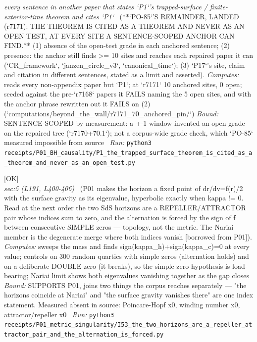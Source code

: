 \begin{description}
\textit{every sentence in another paper that states `P1`'s trapped-surface / finite-exterior-time theorem and cites `P1`} \ (**`PO-85`'S REMAINDER, LANDED (r7171): THE THEOREM IS CITED AS A THEOREM AND NEVER AS AN OPEN TEST, AT EVERY SITE A SENTENCE-SCOPED ANCHOR CAN FIND.** (1) absence of the open-test grade in each anchored sentence; (2) presence: the anchor still finds >= 10 sites and reaches each repaired paper it can (`CR\_framework`, `janzen\_circle\_v3`, `canonical\_time`); (3) `P17`'s site, claim and citation in different sentences, stated as a limit and asserted). 
\emph{Computes:} reads every non-appendix paper but `P1`; at `r7171` 10 anchored sites, 0 open; seeded against the pre-`r7168` papers it FAILS naming the 5 open sites, and with the anchor phrase rewritten out it FAILS on (2) (`computations/beyond\_the\_wall/r7171\_70\_anchored\_pin/`)
 \emph{Bound:} SENTENCE-SCOPED by measurement: a +-1 window invented an open grade on the repaired tree (`r7170+70.1`); not a corpus-wide grade check, which `PO-85` measured impossible from source
\ \emph{Run:} \texttt{python3 receipts/P01\_BH\_causality/P1\_the\_trapped\_surface\_theorem\_is\_cited\_as\_a\_theorem\_and\_never\_as\_an\_open\_test.py}
\item[\rcptlabel{I53_the_two_horizons_are_a_repeller_attractor_pair_and_the_alternation_is_forced}{P1R5}\textbf{P1R5}\quad\texttt{I53\_the\_two\_horizons\_are\_a\_repeller\_attractor\_pair\_and\_the\_alternation\_is\_forced}]\hfill\textsf{[OK]}\\
\textit{sec:5 (L191, L400-406)} \ (P01 makes the horizon a fixed point of dr/dv=f(r)/2 with the surface gravity as its eigenvalue, hyperbolic exactly when kappa != 0. Read at the next order the two SdS horizons are a REPELLER/ATTRACTOR pair whose indices sum to zero, and the alternation is forced by the sign of f between consecutive SIMPLE zeros --- topology, not the metric. The Nariai member is the degenerate merge where both indices vanish [borrowed from P01]). 
\emph{Computes:} sweeps the mass and finds sign(kappa\_h)+sign(kappa\_c)=0 at every value; controls on 300 random quartics with simple zeros (alternation holds) and on a deliberate DOUBLE zero (it breaks), so the simple-zero hypothesis is load-bearing; Nariai limit shows both eigenvalues vanishing together as the gap closes
 \emph{Bound:} SUPPORTS P01, joins two things the corpus reaches separately --- "the horizons coincide at Nariai" and "the surface gravity vanishes there" are one index statement. Measured absent in source: Poincare-Hopf x0, winding number x0, attractor/repeller x0
\ \emph{Run:} \texttt{python3 receipts/P01\_metric\_singularity/I53\_the\_two\_horizons\_are\_a\_repeller\_attractor\_pair\_and\_the\_alternation\_is\_forced.py}
\end{description}\endgroup
